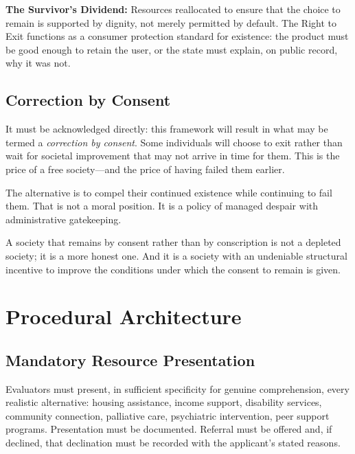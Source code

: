 \documentclass[11pt, letterpaper]{article}
\begin{document}
\begin{tcolorbox}[policybox]
\textbf{The Survivor's Dividend:} Resources reallocated to ensure that the choice to remain
is supported by dignity, not merely permitted by default. The Right to Exit functions as a
consumer protection standard for existence: the product must be good enough to retain the
user, or the state must explain, on public record, why it was not.
\end{tcolorbox}

\subsection{Correction by Consent}

It must be acknowledged directly: this framework will result in what may be termed a
\textit{correction by consent}. Some individuals will choose to exit rather than wait for
societal improvement that may not arrive in time for them. This is the price of a free
society---and the price of having failed them earlier.

The alternative is to compel their continued existence while continuing to fail them. That
is not a moral position. It is a policy of managed despair with administrative gatekeeping.

A society that remains by consent rather than by conscription is not a depleted society; it
is a more honest one. And it is a society with an undeniable structural incentive to improve
the conditions under which the consent to remain is given.

\newpage

\section{Procedural Architecture}

\subsection{Mandatory Resource Presentation}

Evaluators must present, in sufficient specificity for genuine comprehension, every realistic
alternative: housing assistance, income support, disability services, community connection,
palliative care, psychiatric intervention, peer support programs. Presentation must be
documented. Referral must be offered and, if declined, that declination must be recorded with
the applicant's stated reasons.
\end{document}
